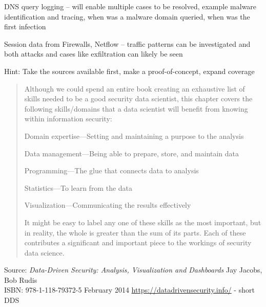 \documentclass[Screen16to9,17pt]{foils}
\begin{document}
\begin{list2}
\item DNS query logging -- will enable multiple cases to be resolved, example malware identification and tracing, when was a malware domain queried, when was the first infection
\item Session data from Firewalls, Netflow -- traffic patterns can be investigated and both attacks and cases like exfiltration can likely be seen
\end{list2}

Hint: Take the sources available first, make a proof-of-concept, expand coverage


\begin{quote}
Although we could spend an entire book creating an exhaustive list of skills needed to be a good security data scientist, this chapter covers the following skills/domains that a data scientist will benefit from
knowing within information security:
\begin{list2}
\item Domain expertise—Setting and maintaining a purpose to the analysis
\item Data management—Being able to prepare, store, and maintain data
\item Programming—The glue that connects data to analysis
\item Statistics—To learn from the data
\item Visualization—Communicating the results effectively
\end{list2}
It might be easy to label any one of these skills as the most important, but in reality, the whole is greater than the sum of its parts. Each of these contributes a significant and important piece to the workings of
security data science.
\end{quote}

Source: \emph{Data-Driven Security: Analysis, Visualization and Dashboards} Jay Jacobs, Bob Rudis\\
ISBN: 978-1-118-79372-5 February 2014 \url{https://datadrivensecurity.info/} - short DDS



\end{document}
